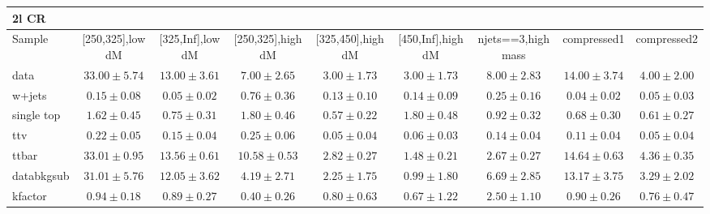 \begin{table}
\begin{center}
\small
\begin{tabular}{lcccccccc}
\hline
2l CR & & & & & & & &\\
\hline
Sample&[250,325],low dM&[325,Inf],low dM&[250,325],high dM&[325,450],high dM&[450,Inf],high dM&njets==3,high mass&compressed1&compressed2\\
\hline
data&$33.00\pm5.74$&$13.00\pm3.61$&$7.00\pm2.65$&$3.00\pm1.73$&$3.00\pm1.73$&$8.00\pm2.83$&$14.00\pm3.74$&$4.00\pm2.00$\\
\hline
w+jets&$0.15\pm0.08$&$0.05\pm0.02$&$0.76\pm0.36$&$0.13\pm0.10$&$0.14\pm0.09$&$0.25\pm0.16$&$0.04\pm0.02$&$0.05\pm0.03$\\
single top&$1.62\pm0.45$&$0.75\pm0.31$&$1.80\pm0.46$&$0.57\pm0.22$&$1.80\pm0.48$&$0.92\pm0.32$&$0.68\pm0.30$&$0.61\pm0.27$\\
ttv&$0.22\pm0.05$&$0.15\pm0.04$&$0.25\pm0.06$&$0.05\pm0.04$&$0.06\pm0.03$&$0.14\pm0.04$&$0.11\pm0.04$&$0.05\pm0.04$\\
ttbar&$33.01\pm0.95$&$13.56\pm0.61$&$10.58\pm0.53$&$2.82\pm0.27$&$1.48\pm0.21$&$2.67\pm0.27$&$14.64\pm0.63$&$4.36\pm0.35$\\
databkgsub&$31.01\pm5.76$&$12.05\pm3.62$&$4.19\pm2.71$&$2.25\pm1.75$&$0.99\pm1.80$&$6.69\pm2.85$&$13.17\pm3.75$&$3.29\pm2.02$\\
kfactor&$0.94\pm0.18$&$0.89\pm0.27$&$0.40\pm0.26$&$0.80\pm0.63$&$0.67\pm1.22$&$2.50\pm1.10$&$0.90\pm0.26$&$0.76\pm0.47$\\
\hline\hline
\end{tabular}
\end{center}
\end{table}
